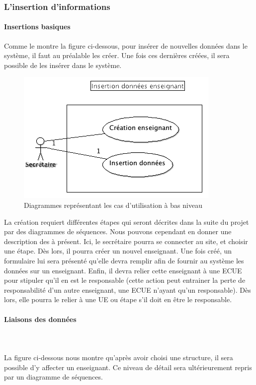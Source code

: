 \documentclass[letter, 11pt] {article}
\begin{document}
		\subsubsection{L'insertion d'informations}
		
\paragraph{Insertions basiques} Comme le montre la figure ci-dessous, pour insérer de nouvelles données dans le système, il faut au préalable les créer. Une fois ces dernières créées, il sera possible de les insérer dans le système.

\begin{figure}[!h]
\includegraphics[scale = 0.7]{../UseCase/UseCaseBasNiveau/InsertionDonneesEnseignant.png}
\caption{Diagrammes représentant les cas d'utilisation à bas niveau}
\end{figure}

La création requiert différentes étapes qui seront décrites dans la suite du projet par des diagrammes de séquences.
Nous pouvons cependant en donner une description des à présent. Ici, le secrétaire
pourra se connecter au site, et choisir une étape. Dès lors, il pourra créer un nouvel enseignant.
Une fois créé, un formulaire lui sera présenté qu'elle devra remplir afin de fournir au système les
données sur un enseignant. Enfin, il devra relier cette enseignant à une ECUE pour stipuler qu'il en
est le responsable (cette action peut entrainer la perte de responsabilité d'un autre enseignant, une ECUE n'ayant
qu'un responsable). Dès lors, elle pourra le relier à une UE ou étape s'il doit en être le responsable.


\paragraph{Liaisons des données}~\paragraph{ }La figure ci-dessous nous montre qu'après avoir choisi une structure, il sera possible d'y affecter un enseignant. Ce niveau de détail sera ultérieurement repris par un diagramme de séquences.
\end{document}
